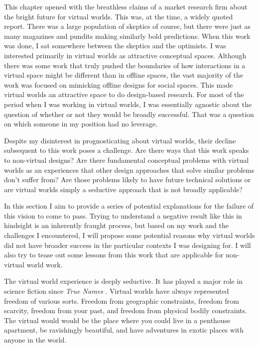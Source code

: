 This chapter opened with the breathless claims of a market research firm about the bright future for virtual worlds. This was, at the time, a widely quoted report. There was a large population of skeptics of course, but there were just as many magazines and pundits making similarly bold predictions. When this work was done, I sat somewhere between the skeptics and the optimists. I was interested primarily in virtual worlds as attractive conceptual spaces. Although there was some work that truly pushed the boundaries of how interactions in a virtual space might be different than in offline spaces, the vast majority of the work was focused on mimicking offline designs for social spaces. This made virtual worlds an attractive space to do design-based research. For most of the period when I was working in virtual worlds, I was essentially agnostic about the question of whether or not they would be broadly successful. That was a question on which  someone in my position had no leverage.

Despite my disinterest in prognosticating about virtual worlds, their decline subsequent to this work poses a challenge. Are there ways that this work speaks to non-virtual designs? Are there fundamental conceptual problems with virtual worlds as an experiences that other design approaches that solve similar problems don't suffer from? Are those problems likely to have future technical solutions or are virtual worlds simply a seductive approach that is not broadly applicable?

In this section I aim to provide a series of potential explanations for the failure of this vision to come to pass. Trying to understand a negative result like this in hindsight is an inherently fraught process, but based on my work and the challenges I encountered, I will propose some potential reasons why virtual worlds did not have broader success in the particular contexts I was designing for. I will also try to tease out some lessons from this work that are applicable for non-virtual world work.


The virtual world experience is deeply seductive. It has played a major role in science fiction since \emph{True Names} \citep{Vinge:1987ty}. Virtual worlds have always represented freedom of various sorts. Freedom from geographic constraints, freedom from scarcity, freedom from your past, and freedom from physical bodily constraints. The virtual would would be the place where you could live in a penthouse apartment, be ravishingly beautiful, and have adventures in exotic places with anyone in the world. 

